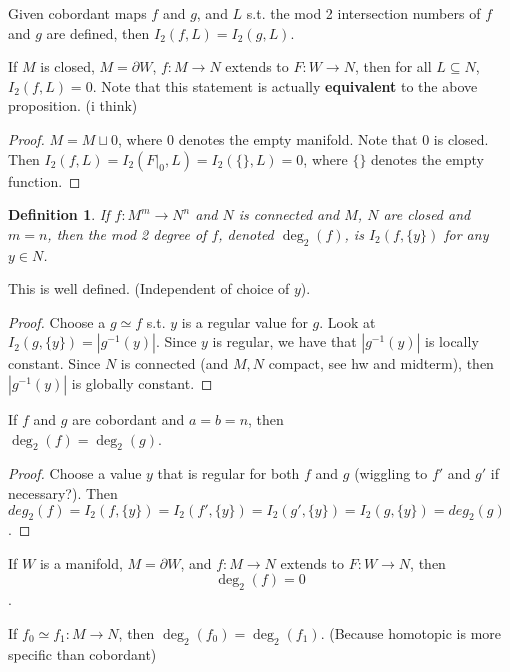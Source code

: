\documentclass[11pt,leqno,oneside]{amsart}
\newcommand{\homotopic}{\simeq}
\renewcommand{\d}{\partial}
\newcommand{\de}{\emph}
\theoremstyle{mystyle} \newtheorem{thrm}[thm]{Theorem}
\theoremstyle{mystyle} \newtheorem{defi}[thm]{Definition}
\begin{document}
\begin{prop}
	Given cobordant maps $f$ and $g$, and $L$ s.t. the mod 2 intersection numbers of $f$ and $g$ are defined, then $I_2(f, L) = I_2(g, L)$.
\end{prop}
\begin{cor}
	If $M$ is closed, $M = \d W$, $f: M \to N$ extends to $F: W \to N$, then for all $L \subseteq N$, $I_2(f, L) = 0$.  Note that this statement is actually \textbf{equivalent} to the above proposition. (i think)
\end{cor}
\begin{proof}
	$M = M \sqcup 0$, where 0 denotes the empty manifold.  Note that 0 is closed.  Then $I_2(f, L) = I_2(F|_0, L) = I_2(\{\}, L) = 0$, where $\{\}$ denotes the empty function.
\end{proof}
\begin{defi}
	If $f : M^m \to N^n$ and $N$ is connected and $M$, $N$ are closed and $m=n$, then the \de{mod 2 degree} of $f$, denoted $\deg_2(f)$, is $I_2(f, \{y\})$ for any $y \in N$.
\end{defi}

\begin{prop}
	This is well defined.  (Independent of choice of $y$).
\end{prop}
\begin{proof}
	Choose a $g \homotopic f$ s.t. $y$ is a regular value for $g$.  Look at $I_2(g, \{y\}) = |g^{-1}(y)|$.  Since $y$ is regular, we have that $|g^{-1}(y)|$ is locally constant.  Since $N$ is connected (and $M,N$ compact, see hw and midterm), then $|g^{-1}(y)|$ is globally constant.
\end{proof}
\begin{prop}
	If $f$ and $g$ are cobordant and $a=b=n$, then \\$\deg_2(f) = \deg_2(g)$.
\end{prop}
\begin{proof}
	Choose a value $y$ that is regular for both $f$ and $g$ (wiggling to $f'$ and $g'$ if necessary?).  Then $deg_2(f) = I_2(f, \{y\}) = I_2(f', \{y\}) = I_2(g', \{y\}) = I_2(g, \{y\}) = deg_2(g)$.
\end{proof}
\begin{cor}
	If $W$ is a manifold, $M = \d W$, and
	$f: M \to N$
	extends to $F: W \to N$,
	then $$\deg_2(f) = 0$$.
\end{cor}
\begin{cor}
	If $f_0 \homotopic f_1: M \to N$, then $\deg_2(f_0) = \deg_2(f_1)$.  (Because homotopic is more specific than cobordant)
\end{cor}
\end{document}
